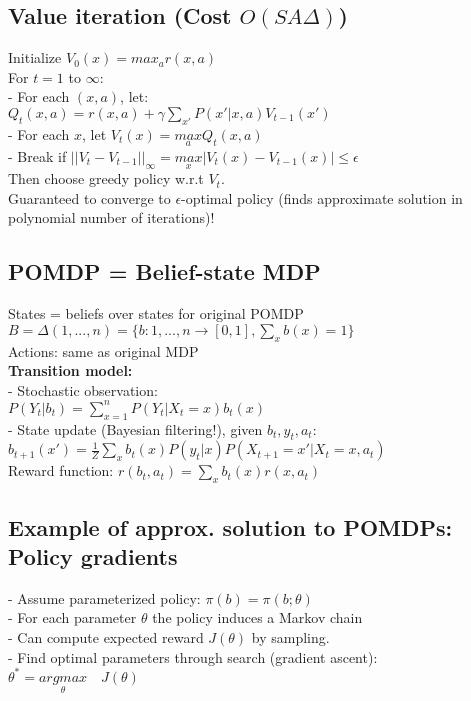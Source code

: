 \subsection{Value iteration (Cost $O(SA\Delta)$)}
Initialize $V_0(x)=max_a r(x,a)$\\
For $t=1$ to $\infty$:\\
- For each $(x,a)$, let: \\
$Q_t(x,a)=r(x,a)+\gamma\sum_{x'}P(x'|x,a)V_{t-1}(x')$\\
- For each $x$, let $V_t(x)=\underset{a}{max}Q_t(x,a)$\\
- Break if $||V_t-V_{t-1}||_{\infty}=\underset{x}{max}|V_t(x)-V_{t-1}(x)|\leq\epsilon$\\
Then choose greedy policy w.r.t $V_t$.\\
Guaranteed to converge to $\epsilon$-optimal policy (finds approximate solution in polynomial number of iterations)!

\subsection{POMDP = Belief-state MDP}
States = beliefs over states for original POMDP\\
$B=\Delta({1,...,n})=\{ b:{1,...,n} \rightarrow [0,1],\sum_x b(x)=1 \}$\\
Actions: same as original MDP\\
\textbf{Transition model:}\\
- Stochastic observation:\\
$P(Y_t|b_t)=\sum_{x=1}^n P(Y_t|X_t=x)b_t(x)$\\
- State update (Bayesian filtering!), given $b_t, y_t, a_t$:
$b_{t+1}(x')=\frac{1}{Z}\sum_xb_t(x)P(y_t|x)P(X_{t+1}=x'|X_t=x,a_t)$\\
Reward function: $r(b_t, a_t)=\sum_x b_t(x)r(x,a_t)$

\subsection{Example of approx. solution to POMDPs: Policy gradients}
- Assume parameterized policy: $\pi(b)=\pi(b;\theta)$\\
- For each parameter $\theta$ the policy induces a Markov chain\\
- Can compute expected reward $J(\theta)$ by sampling.\\
- Find optimal parameters through search (gradient ascent):
$\theta^* = \underset{\theta}{arg max}\quad J(\theta)$


